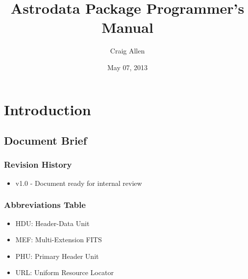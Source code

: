 \documentclass[letterpaper,10pt,english]{sphinxmanual}
\title{Astrodata Package Programmer's Manual}
\date{May 07, 2013}
\author{Craig Allen}
\begin{document}
\maketitle
\setcounter{tocdepth}{6}
\tableofcontents
{}\label{index::doc}



\chapter{Introduction}
\label{chapter_intro:introduction}\label{chapter_intro:the-astrodata-manual}\label{chapter_intro::doc}

\section{Document Brief}
\label{documentBrief:document-brief}\label{documentBrief::doc}

\subsection{Revision History}
\label{gen.ADMANUAL_RevisionHistory:revision-history}\label{gen.ADMANUAL_RevisionHistory::doc}\begin{itemize}
\item {} 
v1.0 - Document ready for internal review

\end{itemize}


\subsection{Abbreviations Table}
\label{gen.ADMANUAL_Purpose::doc}\label{gen.ADMANUAL_Purpose:abbreviations-table}\begin{itemize}
\item {} 
HDU: Header-Data Unit

\item {} 
MEF: Multi-Extension FITS

\item {} 
PHU: Primary Header Unit

\item {} 
URL: Uniform Resource Locator

\end{itemize}
\end{document}
